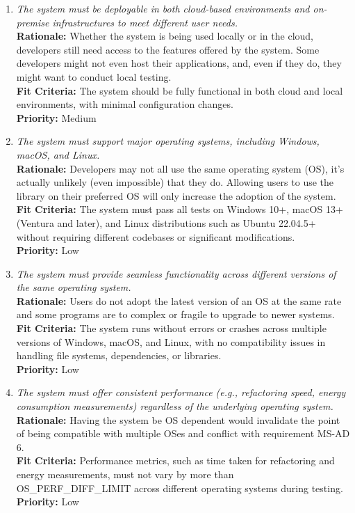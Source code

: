\documentclass[12pt]{article}
\begin{document}
\begin{enumerate}[label=MS-AD \arabic*., wide=0pt, leftmargin=*]
  \item \emph{The system must be deployable in both cloud-based
    environments and on-premise infrastructures to meet different user needs.}\\
    {\bf Rationale:} Whether the system is being used locally or in
    the cloud, developers still need access to the features offered
    by the system. Some developers might not even host their
    applications, and, even if they do, they might want to conduct
    local testing. \\
    {\bf Fit Criteria:} The system should be fully functional in both
    cloud and local environments, with minimal configuration changes.\\
    {\bf Priority:} Medium

  \item \emph{The system must support major operating systems,
    including Windows, macOS, and Linux.}\\
    {\bf Rationale:} Developers may not all use the same operating
    system (OS), it's actually unlikely (even impossible) that they
    do. Allowing users to use the library on their preferred OS will
    only increase the adoption of the system.\\
    {\bf Fit Criteria:} The system must pass all tests on Windows
    10+, macOS 13+ (Ventura and later), and Linux distributions such
    as Ubuntu 22.04.5+ without requiring different codebases or
    significant modifications.\\
    {\bf Priority:} Low

  \item \emph{The system must provide seamless functionality across
    different versions of the same operating system.}\\
    {\bf Rationale:} Users do not adopt the latest version of an OS
    at the same rate and some programs are to complex or fragile to
    upgrade to newer systems.\\
    {\bf Fit Criteria:} The system runs without errors or crashes
    across multiple versions of Windows, macOS, and Linux, with no
    compatibility issues in handling file systems, dependencies, or libraries.\\
    {\bf Priority:} Low

  \item \emph{The system must offer consistent performance (e.g.,
      refactoring speed, energy consumption measurements) regardless of
    the underlying operating system.}\\
    {\bf Rationale:} Having the system be OS dependent would
    invalidate the point of being compatible with multiple OSes and
    conflict with requirement MS-AD 6.\\
    {\bf Fit Criteria:} Performance metrics, such as time taken for
    refactoring and energy measurements, must not vary by more than
    OS\_PERF\_DIFF\_LIMIT across different operating systems during testing.\\
    {\bf Priority:} Low

\end{enumerate}
\end{document}
